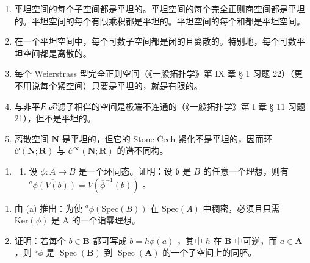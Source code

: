 \begin{enumerate}
\def\labelenumi{(\alph{enumi})}
\setcounter{enumi}{1}
\item
  平坦空间的每个子空间都是平坦的。平坦空间的每个完全正则商空间都是平坦的。平坦空间的每个有限乘积都是平坦的。平坦空间的每个和都是平坦空间。
\item
  在一个平坦空间中，每个可数子空间都是闭的且离散的。特别地，每个可数平坦空间都是离散的。
\item
  每个 Weierstrass 型完全正则空间（《一般拓扑学》第 IX 章 § 1 习题 22）（更不用说每个紧空间）只要是平坦的，就是有限的。
\item
  与非平凡超滤子相伴的空间是极端不连通的（《一般拓扑学》第 I 章 § 11 习题 21），但不是平坦的。
\item
  离散空间 \(\mathbf{N}\) 是平坦的，但它的 Stone-Čech 紧化不是平坦的，因而环 \(\mathcal{C}(\mathbf{N};\mathbf{R})\) 与 \(\mathcal{C}^{\infty}(\mathbf{N};\mathbf{R})\) 的谱不同构。
\end{enumerate}

\begin{enumerate}
\def\labelenumi{\arabic{enumi}.}
\setcounter{enumi}{18}
\tightlist
\item
  \begin{enumerate}
  \def\labelenumii{(\alph{enumii})}
  \tightlist
  \item
    设 \(\phi: A \to B\) 是一个环同态。证明：设 \(\mathfrak{b}\) 是 \(B\) 的任意一个理想，则有 \(\overline{^a\phi(V(b))} = V(\overline{\phi}^{-1}(b))\) 。
  \end{enumerate}
\end{enumerate}

\begin{enumerate}
\def\labelenumi{(\alph{enumi})}
\setcounter{enumi}{1}
\item
  由 (a) 推出：为使 \(^{a}\phi(\text{Spec}(B))\) 在 \(\text{Spec}(A)\) 中稠密，必须且只需 \(\text{Ker}(\phi)\) 是 A 的一个诣零理想。
\item
  证明：若每个 \(b \in \mathbf{B}\) 都可写成 \(b = h\phi(a)\) ，其中 \(h\) 在 \(\mathbf{B}\) 中可逆，而 \(a \in \mathbf{A}\) ，则 \(^a\phi\) 是 \(\operatorname{Spec}(\mathbf{B})\) 到 \(\operatorname{Spec}(\mathbf{A})\) 的一个子空间上的同胚。
\end{enumerate}

